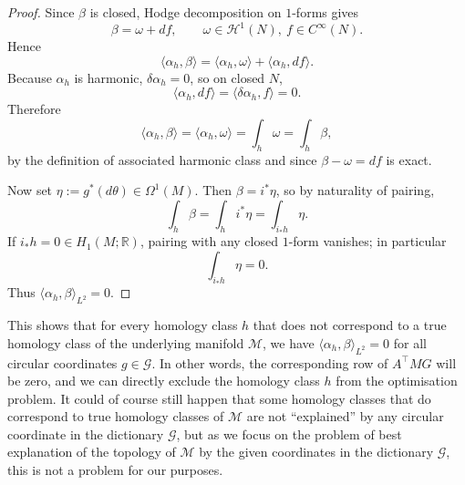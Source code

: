 \documentclass[a4paper,11pt, DIV=10]{scrartcl}
\numberwithin{equation}{section}
\theoremstyle{definition}
\theoremstyle{remark}
\newcommand{\mc}[1]{\mathcal{#1}}
\begin{document}
\begin{proof}
Since $\beta$ is closed, Hodge decomposition on $1$-forms gives
\begin{equation}
\beta=\omega+df,\qquad \omega\in\mathcal H^1(N),\ f\in C^\infty(N).
\end{equation}
Hence
\begin{equation}
\langle \alpha_h,\beta\rangle
=\langle \alpha_h,\omega\rangle+\langle \alpha_h,df\rangle.
\end{equation}
Because $\alpha_h$ is harmonic, $\delta\alpha_h=0$, so on closed $N$,
\begin{equation}
\langle \alpha_h,df\rangle=\langle \delta\alpha_h,f\rangle=0.
\end{equation}
Therefore
\begin{equation}
\langle \alpha_h,\beta\rangle=\langle \alpha_h,\omega\rangle=\int_h \omega=\int_h \beta,
\end{equation}
by the definition of associated harmonic class and since $\beta-\omega=df$ is exact.

Now set $\eta:=g^*(d\theta)\in\Omega^1(M)$. Then $\beta=i^*\eta$, so by naturality of pairing,
\begin{equation}
\int_h \beta=\int_h i^*\eta=\int_{i_*h}\eta.
\end{equation}
If $i_*h=0\in H_1(M;\mathbb R)$, pairing with any closed $1$-form vanishes; in particular
\begin{equation}
\int_{i_*h}\eta=0.
\end{equation}
Thus $\langle \alpha_h,\beta\rangle_{L^2}=0$.
\end{proof}
This shows that for every homology class $h$ that does not correspond to a true homology class of the underlying manifold $\mc{M}$, we have $\langle \alpha_h,\beta\rangle_{L^2}=0$ for all circular coordinates $g\in \mathcal{G}$.
In other words, the corresponding row of $A^\top MG$ will be zero, and we can directly exclude the homology class $h$ from the optimisation problem.
It could of course still happen that some homology classes that do correspond to true homology classes of $\mc{M}$ are not \enquote{explained} by any circular coordinate in the dictionary $\mathcal{G}$, but as we focus on the problem of best explanation of the topology of $\mc{M}$ by the given coordinates in the dictionary $\mathcal{G}$, this is not a problem for our purposes.
\end{document}
